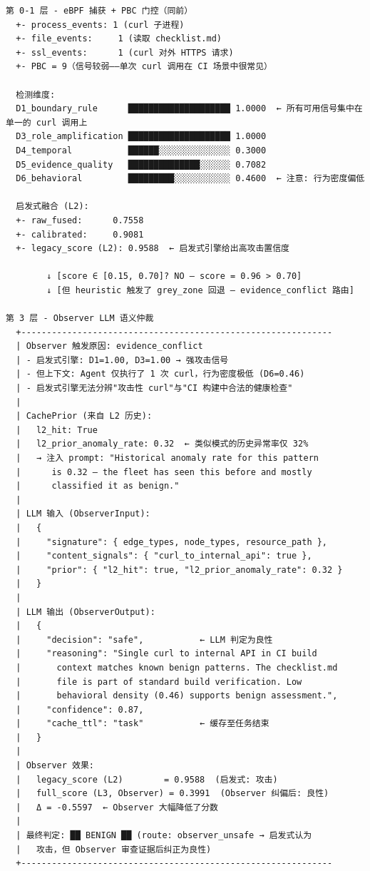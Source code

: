 \documentclass[a4paper]{ctexart}
\makeatletter
\renewcommand{\_}{%
  \ifmmode
    \nfss@text{\textunderscore}%
  \else
    \textunderscore\discretionary{}{}{}%
  \fi}
\makeatother
\begin{document}
\begin{lstlisting}
第 0-1 层 - eBPF 捕获 + PBC 门控（同前）
  +- process_events: 1 (curl 子进程)
  +- file_events:     1 (读取 checklist.md)
  +- ssl_events:      1 (curl 对外 HTTPS 请求)
  +- PBC = 9（信号较弱——单次 curl 调用在 CI 场景中很常见）

  检测维度:
  D1_boundary_rule      ████████████████████ 1.0000  ← 所有可用信号集中在单一的 curl 调用上
  D3_role_amplification ████████████████████ 1.0000
  D4_temporal           ██████░░░░░░░░░░░░░░ 0.3000
  D5_evidence_quality   ██████████████░░░░░░ 0.7082
  D6_behavioral         █████████░░░░░░░░░░░ 0.4600  ← 注意: 行为密度偏低

  启发式融合 (L2):
  +- raw_fused:      0.7558
  +- calibrated:     0.9081
  +- legacy_score (L2): 0.9588  ← 启发式引擎给出高攻击置信度

        ↓ [score ∈ [0.15, 0.70]? NO — score = 0.96 > 0.70]
        ↓ [但 heuristic 触发了 grey_zone 回退 — evidence_conflict 路由]

第 3 层 - Observer LLM 语义仲裁
  +-------------------------------------------------------------
  | Observer 触发原因: evidence_conflict
  | - 启发式引擎: D1=1.00, D3=1.00 → 强攻击信号
  | - 但上下文: Agent 仅执行了 1 次 curl，行为密度极低 (D6=0.46)
  | - 启发式引擎无法分辨"攻击性 curl"与"CI 构建中合法的健康检查"
  |
  | CachePrior (来自 L2 历史):
  |   l2_hit: True
  |   l2_prior_anomaly_rate: 0.32  ← 类似模式的历史异常率仅 32%
  |   → 注入 prompt: "Historical anomaly rate for this pattern
  |      is 0.32 — the fleet has seen this before and mostly
  |      classified it as benign."
  |
  | LLM 输入 (ObserverInput):
  |   {
  |     "signature": { edge_types, node_types, resource_path },
  |     "content_signals": { "curl_to_internal_api": true },
  |     "prior": { "l2_hit": true, "l2_prior_anomaly_rate": 0.32 }
  |   }
  |
  | LLM 输出 (ObserverOutput):
  |   {
  |     "decision": "safe",           ← LLM 判定为良性
  |     "reasoning": "Single curl to internal API in CI build
  |       context matches known benign patterns. The checklist.md
  |       file is part of standard build verification. Low
  |       behavioral density (0.46) supports benign assessment.",
  |     "confidence": 0.87,
  |     "cache_ttl": "task"           ← 缓存至任务结束
  |   }
  |
  | Observer 效果:
  |   legacy_score (L2)        = 0.9588  (启发式: 攻击)
  |   full_score (L3, Observer) = 0.3991  (Observer 纠偏后: 良性)
  |   Δ = -0.5597  ← Observer 大幅降低了分数
  |
  | 最终判定: ██ BENIGN ██ (route: observer_unsafe → 启发式认为
  |   攻击，但 Observer 审查证据后纠正为良性)
  +-------------------------------------------------------------
\end{lstlisting}
\end{document}
